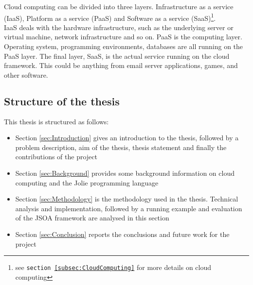 \documentclass[12pt,a4paper]{article}
\begin{document}
Cloud computing can be divided into three layers. Infrastructure as a service (IaaS), Platform as a service (PaaS) and Software as a service (SaaS)\footnote{see \texttt{section \ref{subsec:CloudComputing}} for more details on cloud computing}. \\
IaaS deals with the hardware infrastructure, such as the underlying server or virtual machine, network infrastructure and so on. PaaS is the computing layer. Operating system, programming environments, databases are all running on the PaaS layer. The final layer, SaaS, is the actual service running on the cloud framework. This could be anything from email server applications, games, and other software. 

\subsection{Structure of the thesis}\label{subsec:StructureOfTheReport}
This thesis is structured as follows:
\begin{itemize}
\item Section \ref{sec:Introduction} gives an introduction to the thesis, followed by a problem description, aim of the thesis, thesis statement and finally the contributions of the project

\item Section \ref{sec:Background} provides some background information on cloud computing and the Jolie programming language

\item Section \ref{sec:Methodology} is the methodology used in the thesis. Technical analysis and implementation, followed by a running example and evaluation of the JSOA framework are analysed in this section

\item Section \ref{sec:Conclusion} reports the conclusions and future work for the project
\end{itemize}
\end{document}

